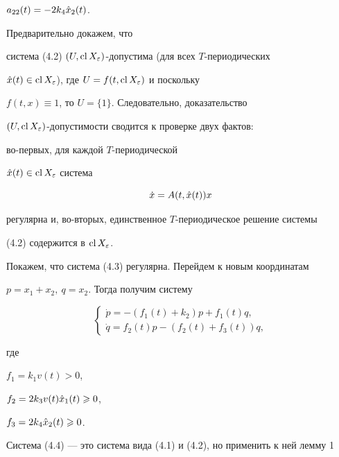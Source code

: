 $a_{22}(t)= -2k_4\Hat x_2(t)$.


Предварительно докажем, что


система (4.2) $(U,\cl X_{\eps})$-допустима (для всех $T$-периодических


$\Hat x(t) \in\cl X_{\eps}$), где $U=f(t,\cl X_{\eps})$ и поскольку


$f(t,x)\equiv 1$, то $U=\{1\}$. Следовательно, доказательство


$(U,\cl X_{\eps})$-допустимости сводится к проверке двух фактов:


во-первых, для  каждой $T$-периодической 


$\Hat x(t)\in\cl X_{\eps}$ система


%


\begin{equation}


\Dot x = A(t, \Hat x(t))x


\end{equation}


%


регулярна и, во-вторых, единственное $T$-периодическое решение системы


(4.2) содержится в $\cl X_{\eps}$.





Покажем, что система (4.3) регулярна. Перейдем к новым координатам


$p=x_1 + x_2,\ q=x_2$. Тогда получим систему


%


\begin{equation}


\begin{cases}


\Dot p= - (f_1(t) + k_2)p + f_1(t)q, \\


\Dot q= f_2(t)p - (f_2(t) + f_3(t))q,


\end{cases}


\end{equation}


%


где


$f_1 = k_1v(t) > 0$, 


$f_2 = 2k_3v(t)\Hat x_1(t)\ge 0$,


$f_3 = 2k_4\Hat x_2(t)\ge 0$.





Система (4.4) --- это система вида (4.1) и (4.2), но применить к ней лемму 1


